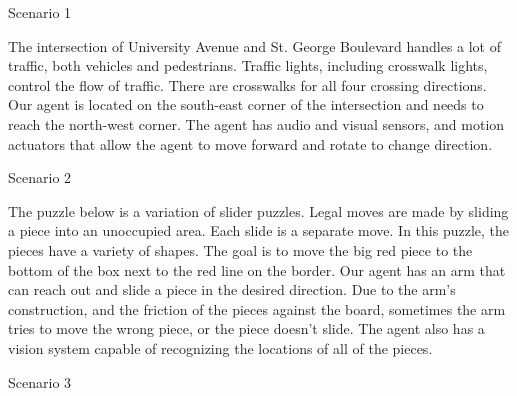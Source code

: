 Scenario 1

The intersection of University Avenue and St. George Boulevard handles a lot of traffic,
both vehicles and pedestrians.  Traffic lights, including crosswalk lights, control the flow of traffic.
There are crosswalks for all four crossing directions.  Our agent is located on the
south-east corner of the intersection and needs to reach the north-west corner.  The
agent has audio and visual sensors, and motion actuators that allow the agent to move
forward and rotate to change direction.



Scenario 2

The puzzle below is a variation of slider puzzles.  Legal moves are made
by sliding a piece into an unoccupied area.  Each slide is a separate
move.  In this puzzle, the pieces have a variety of shapes.  The goal
is to move the big red piece to the bottom of the box next to the
red line on the border.  Our agent has an arm that can reach out
and slide a piece in the desired direction.  Due to the arm's construction,
and the friction of the pieces against the board, sometimes the
arm tries to move the wrong piece, or the piece doesn't slide.
The agent also has a vision system capable of recognizing the
locations of all of the pieces.


Scenario 3



